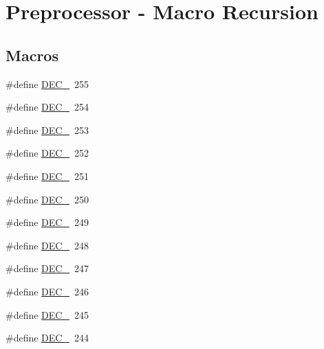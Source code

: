 \hypertarget{group__group__sam0__utils__mrecursion}{}\section{Preprocessor -\/ Macro Recursion}
\label{group__group__sam0__utils__mrecursion}
\subsection*{Macros}
\begin{DoxyCompactItemize}
\item 
\#define \mbox{\hyperlink{group__group__sam0__utils__mrecursion_ga122e290d834df60c7dc9592ba061a1df}{D\+E\+C\+\_}}~255
\item 
\#define \mbox{\hyperlink{group__group__sam0__utils__mrecursion_gae3d83bd50fb00451e7af3b4faef1a2ca}{D\+E\+C\+\_}}~254
\item 
\#define \mbox{\hyperlink{group__group__sam0__utils__mrecursion_ga78c3db4ef9a8fd8488c08ce221e07391}{D\+E\+C\+\_}}~253
\item 
\#define \mbox{\hyperlink{group__group__sam0__utils__mrecursion_ga884962cfd717b002080c1c83657089cd}{D\+E\+C\+\_}}~252
\item 
\#define \mbox{\hyperlink{group__group__sam0__utils__mrecursion_ga65a84cf9c3eb76353a932fcfa1dfd6ff}{D\+E\+C\+\_}}~251
\item 
\#define \mbox{\hyperlink{group__group__sam0__utils__mrecursion_ga9c91e5cacff15380b0e78a5e9cc20381}{D\+E\+C\+\_}}~250
\item 
\#define \mbox{\hyperlink{group__group__sam0__utils__mrecursion_ga22d3ed5a519592f9318cb2f9e2fc28ff}{D\+E\+C\+\_}}~249
\item 
\#define \mbox{\hyperlink{group__group__sam0__utils__mrecursion_ga4685b0aa5e0de7759e2b495cdb3c091f}{D\+E\+C\+\_}}~248
\item 
\#define \mbox{\hyperlink{group__group__sam0__utils__mrecursion_gad9d0e4c92c277962a81ec8e9ab5ba12f}{D\+E\+C\+\_}}~247
\item 
\#define \mbox{\hyperlink{group__group__sam0__utils__mrecursion_ga2f95a1641f02801e40df4fe239be2397}{D\+E\+C\+\_}}~246
\item 
\#define \mbox{\hyperlink{group__group__sam0__utils__mrecursion_gaeec2925fdb054280a794f6b4e109ffb9}{D\+E\+C\+\_}}~245
\item 
\#define \mbox{\hyperlink{group__group__sam0__utils__mrecursion_gad9e66c6dba8689453b9e9f2c0f28341a}{D\+E\+C\+\_}}~244

\end{DoxyCompactItemize}
